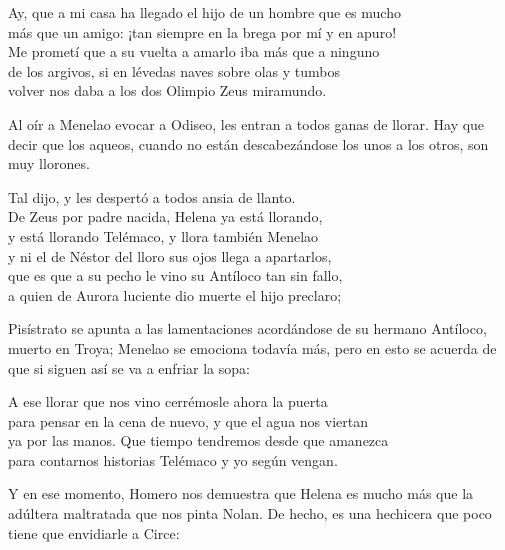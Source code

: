 \begin{versocita}
Ay, que a mi casa ha llegado el hijo de un hombre que es mucho\\
más que un amigo: ¡tan siempre en la brega por mí y en apuro!\\
Me prometí que a su vuelta a amarlo iba más que a ninguno\\
de los argivos, si en lévedas naves sobre olas y tumbos\\
volver nos daba a los dos Olimpio Zeus miramundo.
\end{versocita}

Al oír a Menelao evocar a Odiseo, les entran a todos ganas de llorar.
Hay que decir que los aqueos, cuando no están descabezándose los unos a los otros, son muy llorones.

\begin{versocita}
Tal dijo, y les despertó a todos ansia de llanto.\\
De Zeus por padre nacida, Helena ya está llorando,\\
y está llorando Telémaco, y llora también Menelao\\
y ni el de Néstor del lloro sus ojos llega a apartarlos,\\
que es que a su pecho le vino su Antíloco tan sin fallo,\\
a quien de Aurora luciente dio muerte el hijo preclaro;
\end{versocita}

Pisístrato se apunta a las lamentaciones acordándose de su hermano Antíloco, muerto en Troya; Menelao se emociona todavía más, pero en esto se acuerda de que si siguen así se va a enfriar la sopa:

\begin{versocita}
A ese llorar que nos vino cerrémosle ahora la puerta\\
para pensar en la cena de nuevo, y que el agua nos viertan\\
ya por las manos. Que tiempo tendremos desde que amanezca\\
para contarnos historias Telémaco y yo según vengan.
\end{versocita}

Y en ese momento, Homero nos demuestra que Helena es mucho más que la adúltera maltratada que nos pinta Nolan. De hecho, es una hechicera que poco tiene que envidiarle a Circe:

